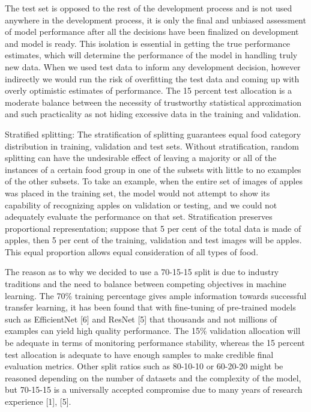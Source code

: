 \documentclass[12pt, openany]{report}
\begin{document}
The test set is opposed to the rest of the development process and is not used anywhere in the development process, it is only the final and unbiased assessment of model performance after all the decisions have been finalized on development and model is ready. This isolation is essential in getting the true performance estimates, which will determine the performance of the model in handling truly new data. When we used test data to inform any development decision, however indirectly we would run the risk of overfitting the test data and coming up with overly optimistic estimates of performance. The 15 percent test allocation is a moderate balance between the necessity of trustworthy statistical approximation and such practicality as not hiding excessive data in the training and validation.

Stratified splitting: The stratification of splitting guarantees equal food category distribution in training, validation and test sets. Without stratification, random splitting can have the undesirable effect of leaving a majority or all of the instances of a certain food group in one of the subsets with little to no examples of the other subsets. To take an example, when the entire set of images of apples was placed in the training set, the model would not attempt to show its capability of recognizing apples on validation or testing, and we could not adequately evaluate the performance on that set. Stratification preserves proportional representation; suppose that 5 per cent of the total data is made of apples, then 5 per cent of the training, validation and test images will be apples. This equal proportion allows equal consideration of all types of food.

The reason as to why we decided to use a 70-15-15 split is due to industry traditions and the need to balance between competing objectives in machine learning. The 70\% training percentage gives ample information towards successful transfer learning, it has been found that with fine-tuning of pre-trained models such as EfficientNet [6] and ResNet [5] that thousands and not millions of examples can yield high quality performance. The 15\% validation allocation will be adequate in terms of monitoring performance stability, whereas the 15 percent test allocation is adequate to have enough samples to make credible final evaluation metrics. Other split ratios such as 80-10-10 or 60-20-20 might be reasoned depending on the number of datasets and the complexity of the model, but 70-15-15 is a universally accepted compromise due to many years of research experience [1], [5].
\end{document}
